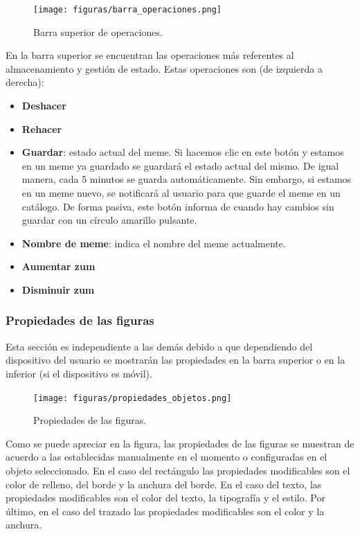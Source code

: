 \begin{figure}[H]
    \caption{Barra superior de operaciones.}
    \centering
    \vspace*{0.5cm}
    \texttt{[image: figuras/barra\_operaciones.png]}
\end{figure}

En la barra superior se encuentran las operaciones más referentes al almacenamiento y gestión de estado. Estas operaciones son (de izquierda a derecha):

\begin{itemize}
    \item \textbf{Deshacer}
    \item \textbf{Rehacer}
    \item \textbf{Guardar}: estado actual del meme. Si hacemos clic en este botón y estamos en un meme ya guardado se guardará el estado actual del mismo. De igual manera, cada 5 minutos se guarda automáticamente. Sin embargo, si estamos en un meme nuevo, se notificará al usuario para que guarde el meme en un catálogo. De forma pasiva, este botón informa de cuando hay cambios sin guardar con un círculo amarillo pulsante.
    \item \textbf{Nombre de meme}: indica el nombre del meme actualmente.
    \item \textbf{Aumentar zum} 
    \item \textbf{Disminuir zum}
\end{itemize}

\subsubsection{Propiedades de las figuras}

Esta sección es independiente a las demás debido a que dependiendo del dispositivo del usuario se mostrarán las propiedades en la barra superior o en la inferior (si el dispositivo es móvil).

\begin{figure}[H]
    \caption{Propiedades de las figuras.}
    \centering
    \vspace*{0.5cm}
    \texttt{[image: figuras/propiedades\_objetos.png]}
\end{figure}

Como se puede apreciar en la figura, las propiedades de las figuras se muestran de acuerdo a las establecidas manualmente en el momento o configuradas en el objeto seleccionado. En el caso del rectángulo las propiedades modificables son el color de relleno, del borde y la anchura del borde. En el caso del texto, las propiedades modificables son el color del texto, la tipografía y el estilo. Por último, en el caso del trazado las propiedades modificables son el color y la anchura.